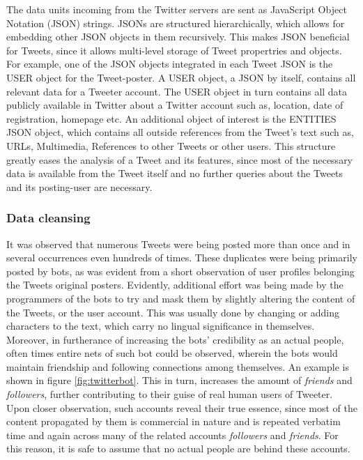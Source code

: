 			\par
			
			The data units incoming from the Twitter servers are sent as JavaScript Object Notation (JSON) strings. JSONs are structured hierarchically, which allows for embedding other JSON objects in them recursively. This makes JSON beneficial for Tweets, since it allows multi-level storage of Tweet propertries and objects. For example, one of the JSON objects integrated in each Tweet JSON is the USER object for the Tweet-poster. A USER object, a JSON by itself, contains all relevant data for a Tweeter account. The USER object in turn contains all data publicly available in Twitter about a Twitter account such as, location, date of registration, homepage etc. An additional object of interest is the ENTITIES JSON object, which contains all outside references from the Tweet's text such as, URLs, Multimedia, References to other Tweets or other users. 
			This structure greatly eases the analysis of a Tweet and its features, since most of the necessary data is available from the Tweet itself and no further queries about the Tweets and its posting-user are necessary.
			\par
		
		\subsubsection*{Data cleansing}
			It was observed that numerous Tweets were being posted more than once and in several occurrences even hundreds of times. These duplicates were being primarily posted by bots, as was evident from a short observation of user profiles belonging the Tweets original posters. Evidently, additional effort was being made by the programmers of the bots to try and mask them by slightly altering the content of the Tweets, or the user account. This was usually done by changing or adding characters to the text, which carry no lingual significance in themselves. Moreover, in furtherance of increasing the bots' credibility as an actual people, often times entire nets of such bot could be observed, wherein the bots would maintain friendship and following connections among themselves. An example is shown in figure \ref{fig:twitterbot}. This in turn, increases the amount of \textit{friends} and \textit{followers}, further contributing to their guise of real human users of Tweeter. Upon closer observation, such accounts reveal their true essence, since most of the content propagated by them is commercial in nature and is repeated verbatim time and again across many of the related accounts \textit{followers} and \textit{friends}. For this reason, it is safe to assume that no actual people are behind these accounts. 
		\par
		
